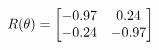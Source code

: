 \documentclass[preview]{standalone}
\begin{document}
\begin{align*}
\special{dvisvgm:raw <g id='unique000'>}R(\theta) = \begin{bmatrix}-0.97 & 0.24\\-0.24 & -0.97\end{bmatrix}\special{dvisvgm:raw </g>}
\end{align*}
\end{document}
